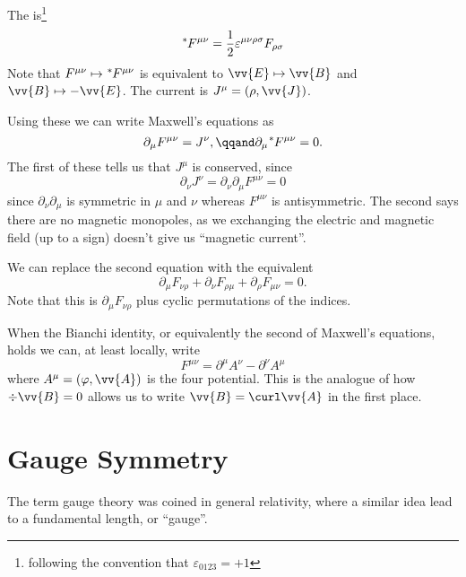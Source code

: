 \documentclass[fleqn]{NotesClass}
\begin{document}
    The  is\footnote{following the convention that \(\varepsilon_{0123} = +1\)}
    \begin{equation}
        \tensor[^*]{F}{^{\mu\nu}} = \frac{1}{2}\varepsilon^{\mu\nu\rho\sigma} F_{\rho\sigma}
    \end{equation}
    Note that \(F^{\mu\nu} \mapsto \tensor[^*]{F}{^{\mu\nu}}\) is equivalent to \(\vv{E} \mapsto \vv{B}\) and \(\vv{B} \mapsto -\vv{E}\).
    The current is \(J^\mu = (\rho, \vv{J})\).
    
    Using these we can write Maxwell's equations as
    \begin{equation}
        \partial_\mu F^{\mu\nu} = J^\nu, \qqand \partial_\mu \tensor[^*]{F}{^{\mu\nu}} = 0.
    \end{equation}
    The first of these tells us that \(J^\mu\) is conserved, since
    \begin{equation}
        \partial_\nu J^\nu = \partial_\nu \partial_\mu F^{\mu\nu} = 0
    \end{equation}
    since \(\partial_\nu \partial_\mu\) is symmetric in \(\mu\) and \(\nu\) whereas \(F^{\mu\nu}\) is antisymmetric.
    The second says there are no magnetic monopoles, as we exchanging the electric and magnetic field (up to a sign) doesn't give us \enquote{magnetic current}.
    
    We can replace the second equation with the equivalent 
    \begin{equation}
        \partial_\mu F_{\nu\rho} + \partial_\nu F_{\rho\mu} + \partial_\rho F_{\mu\nu} = 0.
    \end{equation}
    Note that this is \(\partial_\mu F_{\nu\rho}\) plus cyclic permutations of the indices.
    
    When the Bianchi identity, or equivalently the second of Maxwell's equations, holds we can, at least locally, write
    \begin{equation}
        F^{\mu\nu} = \partial^\mu A^\nu - \partial^\nu A^\mu
    \end{equation}
    where \(A^\mu = (\varphi, \vv{A})\) is the four potential.
    This is the analogue of how \(\div\vv{B} = 0\) allows us to write \(\vv{B} = \curl \vv{A}\) in the first place.
    
    \section{Gauge Symmetry}
    The term gauge theory was coined in general relativity, where a similar idea lead to a fundamental length, or \enquote{gauge}.
    
\end{document}
